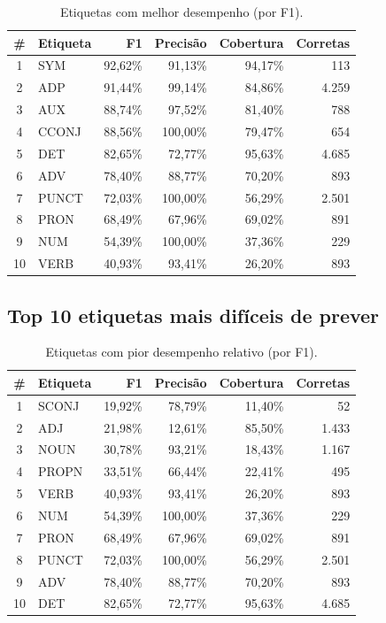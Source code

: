 \documentclass[12pt,a4paper]{article}
\begin{document}
\begin{table}[H]
\centering
\begin{tabular}{clrrrr}
\toprule
\textbf{\#} & \textbf{Etiqueta} & \textbf{F1} & \textbf{Precisão} & \textbf{Cobertura} & \textbf{Corretas} \\
\midrule
1 & SYM   & 92,62\% & 91,13\% & 94,17\% & 113 \\
2 & ADP   & 91,44\% & 99,14\% & 84,86\% & 4.259 \\
3 & AUX   & 88,74\% & 97,52\% & 81,40\% & 788 \\
4 & CCONJ & 88,56\% & 100,00\% & 79,47\% & 654 \\
5 & DET   & 82,65\% & 72,77\% & 95,63\% & 4.685 \\
6 & ADV   & 78,40\% & 88,77\% & 70,20\% & 893 \\
7 & PUNCT & 72,03\% & 100,00\% & 56,29\% & 2.501 \\
8 & PRON  & 68,49\% & 67,96\% & 69,02\% & 891 \\
9 & NUM   & 54,39\% & 100,00\% & 37,36\% & 229 \\
10 & VERB & 40,93\% & 93,41\% & 26,20\% & 893 \\
\bottomrule
\end{tabular}
\caption{Etiquetas com melhor desempenho (por F1).}
\end{table}

\subsection{Top 10 etiquetas mais difíceis de prever}

\begin{table}[H]
\centering
\begin{tabular}{clrrrr}
\toprule
\textbf{\#} & \textbf{Etiqueta} & \textbf{F1} & \textbf{Precisão} & \textbf{Cobertura} & \textbf{Corretas} \\
\midrule
1 & SCONJ & 19,92\% & 78,79\% & 11,40\% & 52 \\
2 & ADJ   & 21,98\% & 12,61\% & 85,50\% & 1.433 \\
3 & NOUN  & 30,78\% & 93,21\% & 18,43\% & 1.167 \\
4 & PROPN & 33,51\% & 66,44\% & 22,41\% & 495 \\
5 & VERB  & 40,93\% & 93,41\% & 26,20\% & 893 \\
6 & NUM   & 54,39\% & 100,00\% & 37,36\% & 229 \\
7 & PRON  & 68,49\% & 67,96\% & 69,02\% & 891 \\
8 & PUNCT & 72,03\% & 100,00\% & 56,29\% & 2.501 \\
9 & ADV   & 78,40\% & 88,77\% & 70,20\% & 893 \\
10 & DET  & 82,65\% & 72,77\% & 95,63\% & 4.685 \\
\bottomrule
\end{tabular}
\caption{Etiquetas com pior desempenho relativo (por F1).}
\end{table}
\end{document}
